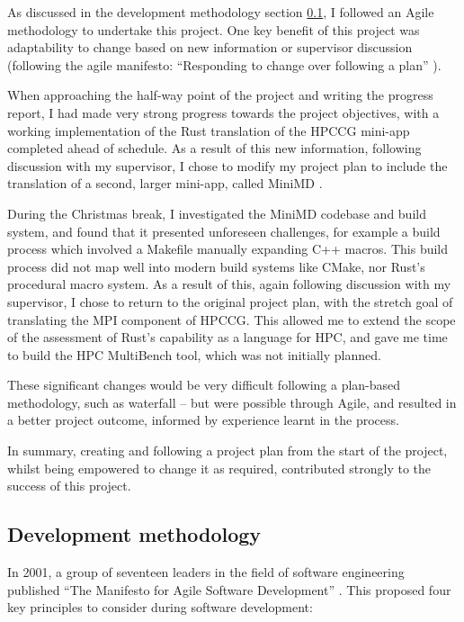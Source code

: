 As discussed in the development methodology section \ref{ssec:organisation-methodology}, I followed an Agile methodology to undertake this project. One key benefit of this project was adaptability to change based on new information or supervisor discussion (following the agile manifesto: ``Responding to change over following a plan'' \cite{beckManifestoAgileSoftware2001}). 

When approaching the half-way point of the project and writing the progress report, I had made very strong progress towards the project objectives, with a working implementation of the Rust translation of the \acrshort{HPCCG} \acrshort{mini-app} completed ahead of schedule. As a result of this new information, following discussion with my supervisor, I chose to modify my project plan to include the translation of a second, larger \acrshort{mini-app}, called MiniMD \cite{osti_1231191}.

During the Christmas break, I investigated the MiniMD codebase and build system, and found that it presented unforeseen challenges, for example a build process which involved a Makefile manually expanding C++ macros. This build process did not map well into modern build systems like CMake, nor Rust's procedural macro system. As a result of this, again following discussion with my supervisor, I chose to return to the original project plan, with the stretch goal of translating the MPI component of \acrshort{HPCCG}. This allowed me to extend the scope of the assessment of Rust's capability as a language for \acrshort{HPC}, and gave me time to build the HPC MultiBench tool, which was not initially planned.

These significant changes would be very difficult following a plan-based methodology, such as waterfall -- but were possible through Agile, and resulted in a better project outcome, informed by experience learnt in the process.

In summary, creating and following a project plan from the start of the project, whilst being empowered to change it as required, contributed strongly to the success of this project.

\subsection{Development methodology}
\label{ssec:organisation-methodology}

In 2001, a group of seventeen leaders in the field of software engineering published ``The Manifesto for Agile Software Development'' \cite{beckManifestoAgileSoftware2001}. This proposed four key principles to consider during software development:

